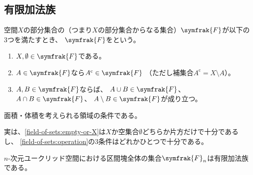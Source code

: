 \documentclass[../sotsu.tex]{subfiles}
\begin{document}
\subsection{有限加法族}

\begin{definition}
    \label{dfn:finitely-additive-class}
    空間$X$の部分集合の（つまり$X$の部分集合からなる集合）$\symfrak{F}$が以下の3つを満たすとき、
    $\symfrak{F}$をという。
    \begin{enumerate}
        \item \label{field-of-sets:empty-or-X}
            $X, \emptyset \in \symfrak{F}$である。
        \item \label{field-of-sets:complementation}
            $A \in \symfrak{F}$なら$A^{\mathrm{c}} \in \symfrak{F}$
            （ただし補集合$A^{\mathrm{c}} = X \setminus A$）。
        \item \label{field-of-sets:operation} 
            $A, B \in \symfrak{F}$ならば、
            $A \cup B \in \symfrak{F}$、
            $A \cap B \in \symfrak{F}$、
            $A \setminus B \in \symfrak{F}$が成り立つ。
    \end{enumerate}
\end{definition}

面積・体積を考えられる領域の条件である。

実は、\cref{field-of-sets:empty-or-X}は$X$か空集合$\emptyset$どちらか片方だけで十分であるし、
\cref{field-of-sets:operation}の3条件はどれかひとつで十分である。

\begin{example}
    $n$-次元ユークリッド空間における区間塊全体の集合$\symfrak{F}_n$は有限加法族である\cite[\S 4]{ito-lebesgue-1963}。
\end{example}
\end{document}
